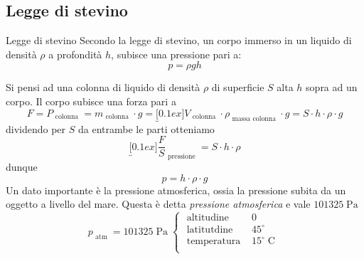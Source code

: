 \subsection{Legge di stevino}
\begin{teorema}{Legge di stevino}
	Secondo la legge di stevino, un corpo immerso in un liquido di densità $ \rho  $ a profondità $ h $, subisce una pressione pari a:
	\[
		p = \rho g h
	\]
\end{teorema}
Si pensi ad una colonna di liquido di densità $ \rho  $ di superficie $ S $ alta $ h $ sopra ad un corpo. Il corpo subisce una forza pari a
\[
	F = P_{\text{ colonna }} = m_{\text{ colonna }} \cdot g =  \underbracket[0.1ex]{V_{\text{ colonna }} \cdot \rho}_{\text{ massa colonna }} \cdot g = S \cdot h \cdot \rho  \cdot  g
\]
dividendo per $ S $ da entrambe le parti otteniamo
\[
	\underbracket[0.1ex]{\frac{F}{S} }_{\text{ pressione }}= S \cdot h \cdot \rho
\]
dunque
\[
	p =   h \cdot  \rho \cdot g
\]
\vskip3mm
Un dato importante è la pressione atmosferica, ossia la pressione subita da un oggetto a livello del mare. Questa è detta \textit{pressione atmosferica} e vale \underline{$ 101325 \operatorname{Pa} $}
\[
	p_{\text{ atm }} = 101325 \operatorname{Pa}
	\begin{cases}
		\text{ altitudine }  & 0                         \\
		\text{ latitutdine } & 45^\circ                  \\
		\text{ temperatura } & 15^\circ \operatorname{C} \\
	\end{cases}
\]

%
%     
%
%
%
%
%
%

